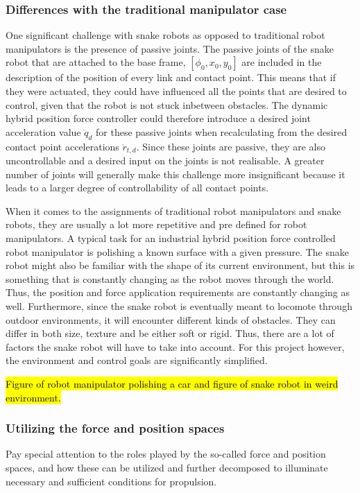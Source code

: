 \subsubsection{Differences with the traditional manipulator case}

One significant challenge with snake robots as opposed to traditional robot manipulators is the presence of passive joints. The passive joints of the snake robot that are attached to the base frame, $[\phi_0, x_0, y_0]$ are included in the description of the position of every link and contact point. This means that if they were actuated, they could have influenced all the points that are desired to control, given that the robot is not stuck inbetween obstacles. The dynamic hybrid position force controller could therefore introduce a desired joint acceleration value $\ddot{q}_d$ for these passive joints when recalculating from the desired contact point accelerations $\ddot{r}_{t,d}$. Since these joints are passive, they are also uncontrollable and a desired input on the joints is not realisable. A greater number of joints will generally make this challenge more insignificant because it leads to a larger degree of controllability of all contact points.

When it comes to the assignments of traditional robot manipulators and snake robots, they are usually a lot more repetitive and pre defined for robot manipulators. A typical task for an industrial hybrid position force controlled robot manipulator is polishing a known surface with a given pressure. The snake robot might also be familiar with the shape of its current environment, but this is something that is constantly changing as the robot moves through the world. Thus, the position and force application requirements are constantly changing as well. Furthermore, since the snake robot is eventually meant to locomote through outdoor environments, it will encounter different kinds of obstacles. They can differ in both size, texture and be either soft or rigid. Thus, there are a lot of factors the snake robot will have to take into account. For this project however, the environment and control goals are significantly simplified.

\hl{Figure of robot manipulator polishing a car and figure of snake robot in weird environment.}



\subsubsection{Utilizing the force and position spaces}

Pay special attention to the
roles played by the so-called force and position spaces, and how these can be utilized and further
decomposed to illuminate necessary and sufficient conditions for propulsion.
